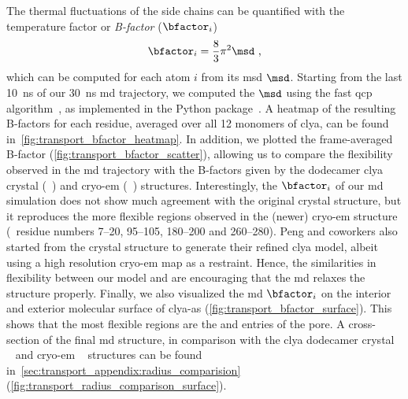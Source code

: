The thermal fluctuations of the side chains can be quantified with the temperature factor or \emph{B-factor}
($\bfactor_i$)~\cite{Bahar-1997}
%
\begin{align}\label{eq:bfactor}
  \bfactor_i = \dfrac{8}{3} \pi^2 \msd \text{ ,}
\end{align}
%
which can be computed for each atom $i$ from its \gls{msd} $\msd$. Starting from the last \SI{10}{\ns} of our
\SI{30}{\ns} \gls{md} trajectory, we computed the $\msd$ using the fast \gls{qcp}
algorithm~\cite{Theobald-2005,Liu-2010}, as implemented in the  Python
package~\cite{MichaudAgrawal-2011}. A heatmap of the resulting B-factors for each residue, averaged over all
12 monomers of \gls{clya}, can be found in~\cref{fig:transport_bfactor_heatmap}. In addition, we plotted the
frame-averaged B-factor (\cref{fig:transport_bfactor_scatter}), allowing us to compare the flexibility
observed in the \gls{md} trajectory with the B-factors given by the dodecamer \gls{clya} crystal
(~\cite{Mueller-2009}) and \gls{cryo-em} (~\cite{Peng-2019}) structures.
Interestingly, the $\bfactor_i$ of our \gls{md} simulation does not show much agreement with the original
 crystal structure, but it reproduces the more flexible regions observed in the (newer)
 \gls{cryo-em} structure (\ie~residue numbers \numrange{7}{20}, \numrange{95}{105},
\numrange{180}{200} and \numrange{260}{280}). Peng and coworkers also started from the  crystal
structure to generate their refined \gls{clya} model, albeit using a high resolution \gls{cryo-em} map as a
restraint. Hence, the similarities in flexibility between our model and  are encouraging that the
\gls{md} relaxes the structure properly. Finally, we also visualized the \gls{md} $\bfactor_i$ on the interior
and exterior molecular surface of \gls{clya-as} (\cref{fig:transport_bfactor_surface}). This shows that the
most flexible regions are the \cisi{} and \transi{} entries of the pore. A cross-section of the final \gls{md}
structure, in comparison with the \gls{clya} dodecamer crystal ~\cite{Mueller-2009} and
\gls{cryo-em} ~\cite{Peng-2019} structures can be found
in~\cref{sec:transport_appendix:radius_comparision} (\cref{fig:transport_radius_comparison_surface}).


